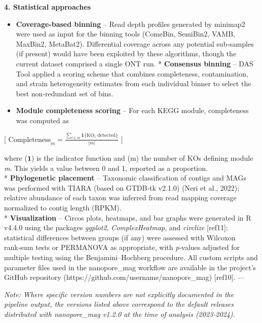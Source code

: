 \documentclass[
  11pt,
]{article}
\providecommand{\tightlist}{%
  \setlength{\itemsep}{0pt}\setlength{\parskip}{0pt}}
\begin{document}
\textbf{4. Statistical approaches}

\begin{itemize}
\tightlist
\item
  \textbf{Coverage‑based binning} -- Read depth profiles generated by
  minimap2 were used as input for the binning tools (ComeBin, SemiBin2,
  VAMB, MaxBin2, MetaBat2). Differential coverage across any potential
  sub‑samples (if present) would have been exploited by these
  algorithms, though the current dataset comprised a single ONT run. *
  \textbf{Consensus binning} -- DAS Tool applied a scoring scheme that
  combines completeness, contamination, and strain heterogeneity
  estimates from each individual binner to select the best non‑redundant
  set of bins.\\
\item
  \textbf{Module completeness scoring} -- For each KEGG module,
  completeness was computed as
\end{itemize}

{[}
\(\text{Completeness}_m = \frac{\sum_{i\in m} \mathbf{1}\{ \text{KO}_i \text{ detected} \}}{|m|}\)
{]}

where (\(\mathbf{1}\)) is the indicator function and
(\textbar m\textbar) the number of KOs defining module \emph{m}. This
yields a value between 0 and 1, reported as a proportion.\\
* \textbf{Phylogenetic placement} -- Taxonomic classification of contigs
and MAGs was performed with TIARA (based on GTDB‑tk v2.1.0) (Neri et
al., 2022); relative abundance of each taxon was inferred from read
mapping coverage normalized to contig length (RPKM).\\
* \textbf{Visualization} -- Circos plots, heatmaps, and bar graphs were
generated in R v4.4.0 using the packages \emph{ggplot2},
\emph{ComplexHeatmap}, and \emph{circlize} {[}ref11{]}; statistical
differences between groups (if any) were assessed with Wilcoxon rank‑sum
tests or PERMANOVA as appropriate, with \emph{p}‑values adjusted for
multiple testing using the Benjamini--Hochberg procedure. All custom
scripts and parameter files used in the nanopore\_mag workflow are
available in the project's GitHub repository
(https://github.com/username/nanopore\_mag) {[}ref10{]}. ---

\emph{Note: Where specific version numbers are not explicitly documented
in the pipeline output, the versions listed above correspond to the
default releases distributed with nanopore\_mag v1.2.0 at the time of
analysis (2023‑2024).}
\end{document}
